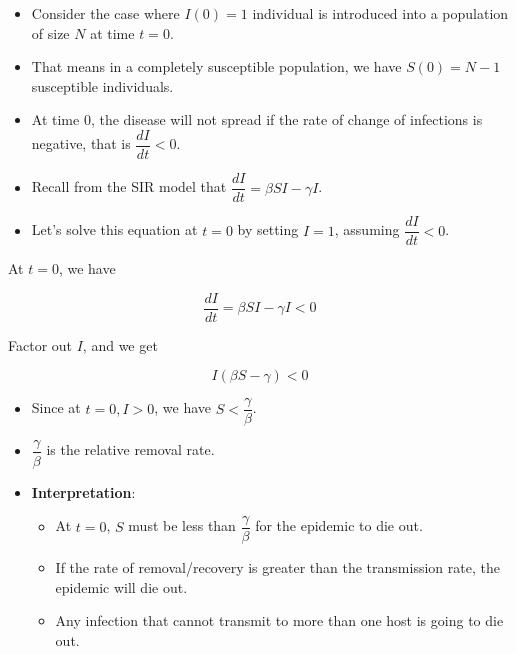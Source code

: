 \documentclass[
  ignorenonframetext,
]{beamer}
\providecommand{\tightlist}{%
  \setlength{\itemsep}{0pt}\setlength{\parskip}{0pt}}\usepackage{longtable,booktabs,array}
\begin{document}
\begin{frame}
\begin{itemize}
\item
  Consider the case where \(I(0) = 1\) individual is introduced into a
  population of size \(N\) at time \(t = 0\).
\item
  That means in a completely susceptible population, we have
  \(S(0) = N - 1\) susceptible individuals.
\end{itemize}
\end{frame}

\begin{frame}
\begin{itemize}
\item
  At time 0, the disease will not spread if the rate of change of
  infections is negative, that is {\(\dfrac{dI}{dt} < 0\)}.
\item
  Recall from the SIR model that
  {\(\dfrac{dI}{dt} = \beta S I - \gamma I\)}.
\item
  Let's solve this equation at \(t = 0\) by setting \(I = 1\), assuming
  {\(\dfrac{dI}{dt} < 0\)}.
\end{itemize}
\end{frame}

\begin{frame}
At \(t = 0\), we have

\begin{equation*}
\frac{dI}{dt} = \beta S I - \gamma I < 0 \end{equation*}

Factor out \(I\), and we get

\begin{equation*}
I (\beta S - \gamma) < 0
\end{equation*}
\end{frame}

\begin{frame}
\begin{itemize}
\item
  Since at \(t=0\)\(, I > 0\), we have {\(S < \dfrac{\gamma}{\beta}\)}.
\item
  {\(\dfrac{\gamma}{\beta}\)} is the relative removal rate.
\end{itemize}
\end{frame}

\begin{frame}
\begin{itemize}
\item
  \textbf{Interpretation}:

  \begin{itemize}
  \tightlist
  \item
    At \(t = 0\), \(S\) must be less than \(\dfrac{\gamma}{\beta}\) for
    the epidemic to die out.
  \item
    If the rate of removal/recovery is greater than the transmission
    rate, the epidemic will die out.
  \item
    Any infection that cannot transmit to more than one host is going to
    die out.
  \end{itemize}
\end{itemize}
\end{frame}
\end{document}
